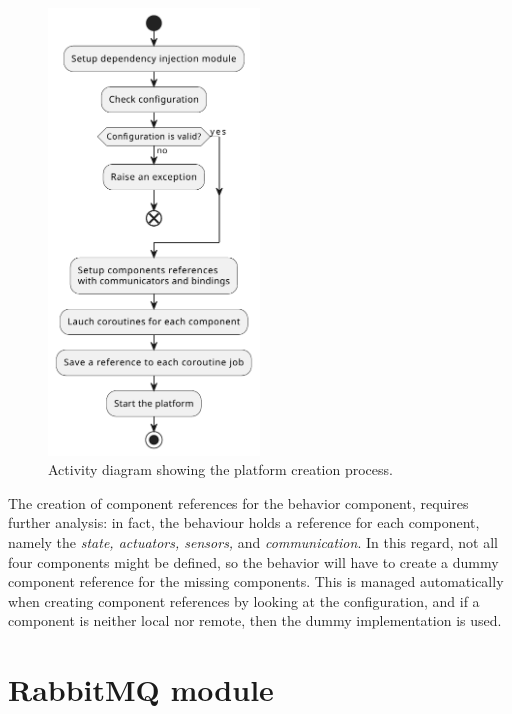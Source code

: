 \begin{figure}
	\centering
	\includegraphics[width=0.5\textwidth]{figures/platform-setup-sequence.pdf}
	\caption{Activity diagram showing the platform creation process.}
	\label{fig:platform-configuration}
\end{figure}

The creation of component references for the behavior component, requires further analysis: in fact, the behaviour holds a reference for each
component, namely the \emph{state, actuators, sensors,} and \emph{communication}.
In this regard, not all four components might be defined, so the behavior will have to create a dummy component reference for the missing components.
This is managed automatically when creating component references by looking at the configuration, and if a component is neither local nor remote,
then the dummy implementation is used.



\section{RabbitMQ module}
\label{sec:rabbitmq-module-impl}

